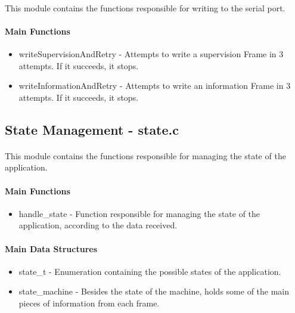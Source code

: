 \documentclass[11pt]{article}
\begin{document}
\paragraph{}This module contains the functions responsible for writing to the serial port.

\paragraph{Main Functions}

\begin{itemize}
  \item{writeSupervisionAndRetry - Attempts to write a supervision Frame in 3 attempts. If it
        succeeds, it stops.}
  \item{writeInformationAndRetry - Attempts to write an information Frame in 3 attempts. If it
        succeeds, it stops.}
\end{itemize}

\subsection{State Management - state.c}

\paragraph{}This module contains the functions responsible for managing the state of the application.

\paragraph{Main Functions}

\begin{itemize}
  \item{handle\_state - Function responsible for managing the state of the application, according to
        the data received.}
\end{itemize}

\paragraph{Main Data Structures}

\begin{itemize}
        \item{state\_t - Enumeration containing the possible states of the application.}
  \item{state\_machine - Besides the state of the machine, holds some of the main pieces of
        information from each frame.}
\end{itemize}
\end{document}
